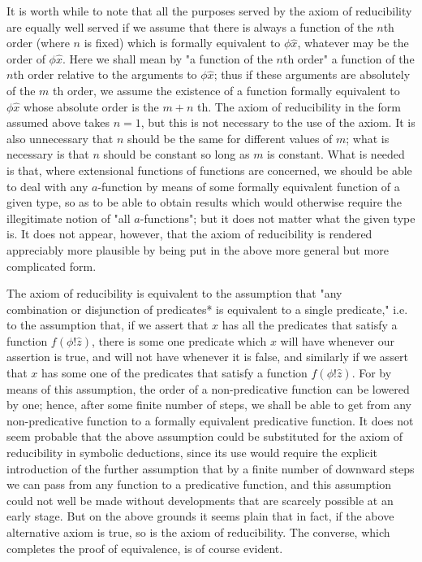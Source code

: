 \documentclass[10pt]{article}
\begin{document}
It is worth while to note that all the purposes served by the axiom of reducibility are equally well served if we assume that there is always a function of the $n$th order (where $n$ is fixed) which is formally equivalent to $\phi \hat{x}$, whatever may be the order of $\phi \hat{x}$. Here we shall mean by "a function of the $n$th order" a function of the $n$th order relative to the arguments to $\phi \hat{x}$; thus if these arguments are absolutely of the $m$ th order, we assume the existence of a function formally equivalent to $\phi \hat{x}$ whose absolute order is the $m+n$ th. The axiom of reducibility in the form assumed above takes $n=1$, but this is not necessary to the use of the axiom. It is also unnecessary that $n$ should be the same for different values of $m$; what is necessary is that $n$ should be constant so long as $m$ is constant. What is needed is that, where extensional functions of functions are concerned, we should be able to deal with any $a$-function by means of some formally equivalent function of a given type, so as to be able to obtain results which would otherwise require the illegitimate notion of "all $a$-functions"; but it does not matter what the given type is. It does not appear, however, that the axiom of reducibility is rendered appreciably more plausible by being put in the above more general but more complicated form.

The axiom of reducibility is equivalent to the assumption that "any\\
combination or disjunction of predicates* is equivalent to a single predicate," i.e. to the assumption that, if we assert that $x$ has all the predicates that satisfy a function $f(\phi!\hat{z})$, there is some one predicate which $x$ will have whenever our assertion is true, and will not have whenever it is false, and similarly if we assert that $x$ has some one of the predicates that satisfy a function $f(\phi!\hat{z})$. For by means of this assumption, the order of a non-predicative function can be lowered by one; hence, after some finite number of steps, we shall be able to get from any non-predicative function to a formally equivalent predicative function. It does not seem probable that the above assumption could be substituted for the axiom of reducibility in symbolic deductions, since its use would require the explicit introduction of the further assumption that by a finite number of downward steps we can pass from any function to a predicative function, and this assumption could not well be made without developments that are scarcely possible at an early stage. But on the above grounds it seems plain that in fact, if the above alternative axiom is true, so is the axiom of reducibility. The converse, which completes the proof of equivalence, is of course evident.
\end{document}
